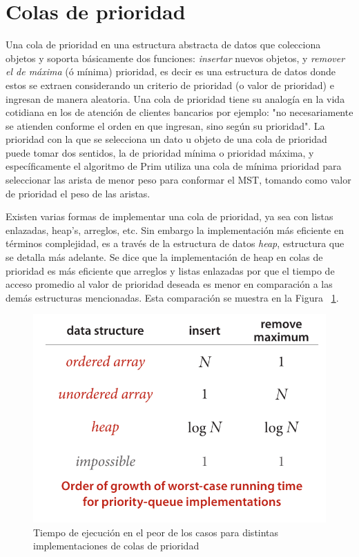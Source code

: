 \documentclass[letterpaper]{article}
\begin{document}
\section{Colas de prioridad}

Una cola de prioridad en una estructura abstracta de datos que colecciona objetos y soporta básicamente dos funciones: \textit{insertar} nuevos objetos, y \textit{remover el de máxima} (ó mínima) prioridad, es decir es una estructura de datos donde estos se extraen considerando un criterio de prioridad (o valor de prioridad) e ingresan de manera aleatoria. Una cola de prioridad tiene su analogía en la vida cotidiana en los de atención de clientes bancarios por ejemplo: "no necesariamente se atienden conforme el orden en que ingresan, sino según su prioridad". La prioridad con la que se selecciona un dato u objeto de una cola de prioridad puede tomar dos sentidos, la de prioridad mínima o prioridad máxima, y específicamente el algoritmo de Prim utiliza una cola de mínima prioridad para seleccionar las arista de menor peso para conformar el  MST, tomando como valor de prioridad el peso de las aristas.

Existen varias formas de implementar una cola de prioridad, ya sea con listas enlazadas, heap's, arreglos, etc. Sin embargo la implementación más eficiente en términos complejidad, es a través de la estructura de datos \textit{heap}, estructura que se detalla más adelante. Se dice que la implementación de heap en colas de prioridad es más eficiente que arreglos y listas enlazadas por que el tiempo de acceso promedio al valor de prioridad deseada es menor en comparación a las demás estructuras mencionadas. Esta comparación se muestra en la Figura ~\ref{fig:complex}.\\

\begin{figure}[H]
\includegraphics[width=.45\textwidth]{Images/complex.png}
\centering
\caption{Tiempo de ejecución en el peor de los casos para distintas implementaciones de colas de prioridad}
\label{fig:complex}
\end{figure}
\end{document}
